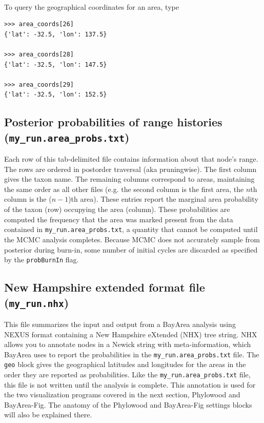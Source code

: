 \documentclass[11pt]{article}
\newcommand{\impmark}{\strut\vadjust{\domark}}
\newcommand{\domark}{%
  \vbox to 0pt{
    \kern-\dp\strutbox
    \smash{\llap{$\rightarrow$\kern1em}}
    \vss
  }%
}
\begin{document}
\noindent \\ \impmark To query the geographical coordinates for an area, type
\begin{framed}
\begin{lstlisting}
>>> area_coords[26]
{'lat': -32.5, 'lon': 137.5}

>>> area_coords[28]
{'lat': -32.5, 'lon': 147.5}

>>> area_coords[29]
{'lat': -32.5, 'lon': 152.5}
\end{lstlisting}
\end{framed}

\subsection{Posterior probabilities of range histories (\texttt{my\_run.area\_probs.txt})}

Each row of this tab-delimited file contains information about that node's range.
The rows are ordered in postorder traversal (aka pruningwise).
The first column gives the taxon name.
The remaining columns correspond to areas, maintaining the same order as all other files (e.g. the second column is the first area, the $n$th column is the ($n-1$)th area).
These entries report the marginal area probability of the taxon (row) occupying the area (column).
These probabilities are computed the frequency that the area was marked present from the data contained in \texttt{my\_run.area\_probs.txt}, a quantity that cannot be computed until the MCMC analysis completes.
Because MCMC does not accurately sample from posterior during burn-in, some number of initial cycles are discarded as specified by the \texttt{probBurnIn} flag.

\subsection{New Hampshire extended format file (\texttt{my\_run.nhx})}

This file summarizes the input and output from a BayArea analysis using NEXUS format containing a New Hampshire eXtended (NHX) tree string.
NHX allows you to annotate nodes in a Newick string with meta-information, which BayArea uses to report the probabilities in the \texttt{my\_run.area\_probs.txt} file.
The \texttt{geo} block gives the geographical latitudes and longitudes for the areas in the order they are reported as probabilities.
Like the \texttt{my\_run.area\_probs.txt} file, this file is not written until the analysis is complete.
This annotation is used for the two visualization programs covered in the next section, Phylowood and BayArea-Fig.
The anatomy of the Phylowood and BayArea-Fig settings blocks will also be explained there.
\end{document}
